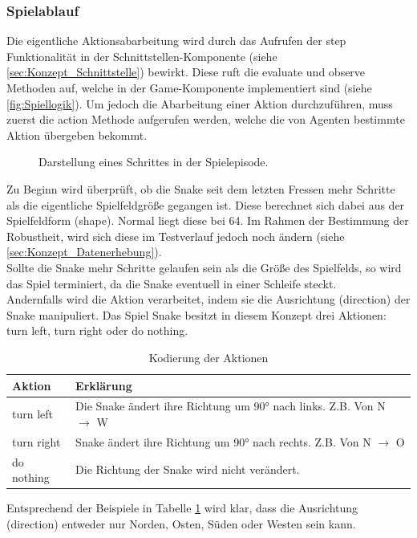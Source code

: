 \subsubsection{Spielablauf} \label{sec:Konzept_Spielablauf}
Die eigentliche Aktionsabarbeitung wird durch das Aufrufen der step Funktionalität in der Schnittstellen-Komponente (siehe \ref{sec:Konzept_Schnittstelle}) bewirkt. Diese ruft die evaluate und observe Methoden auf, welche in der Game-Komponente implementiert sind (siehe \ref{fig:Spiellogik}).
Um jedoch die Abarbeitung einer Aktion durchzuführen, muss zuerst die action Methode aufgerufen werden, welche die von Agenten bestimmte Aktion übergeben bekommt. 
\begin{figure}[H]
	\centering
	\def\svgscale{0.089}
	
	\caption[Spielablauf]{Darstellung eines Schrittes in der Spielepisode.}
	\label{fig:Spielablauf}
\end{figure}
Zu Beginn wird überprüft, ob die Snake seit dem letzten Fressen mehr Schritte als die eigentliche Spielfeldgröße gegangen ist. Diese berechnet sich dabei aus der Spielfeldform (shape). Normal liegt diese bei 64. Im Rahmen der Bestimmung der Robustheit, wird sich diese im Testverlauf jedoch noch ändern (siehe \ref{sec:Konzept_Datenerhebung}).\\
Sollte die Snake mehr Schritte gelaufen sein als die Größe des Spielfelds, so wird das Spiel terminiert, da die Snake eventuell in einer Schleife steckt.\\
Andernfalls wird die Aktion verarbeitet, indem sie die Ausrichtung (direction) der Snake manipuliert. Das Spiel Snake besitzt in diesem Konzept drei Aktionen: turn left, turn right oder do nothing.
\begin{longtable}[h]{|p{4cm}|p{\linewidth - 5cm}|}
	\caption{Kodierung der Aktionen}
	\label{tab:Aktionscodierung} 
	\endfirsthead
	\endhead
	\hline
	Aktion & Erklärung \\
	\hline
	turn left & Die Snake ändert ihre Richtung um 90° nach links. Z.B. Von N $\longrightarrow$ W \\
	\hline
	turn right & Snake ändert ihre Richtung um 90° nach rechts. Z.B. Von N $\longrightarrow$ O \\
	\hline
	do nothing & Die Richtung der Snake wird nicht verändert. \\
	\hline
\end{longtable}
Entsprechend der Beispiele in Tabelle \ref{tab:Aktionscodierung} wird klar, dass die Ausrichtung (direction) entweder nur Norden, Osten, Süden oder Westen sein kann.
